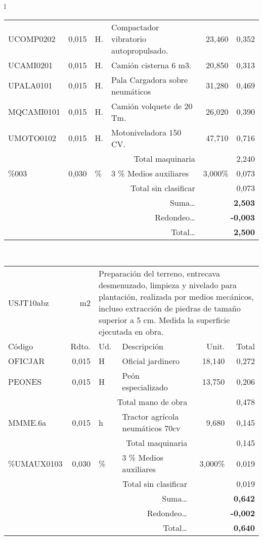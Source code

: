 \documentclass{book}%
\begin{document}
\begin{longtable}{l}
\begin{tabular}{l r l p{60mm} r r}
UCOMP0202&     0,015&H.&Compactador vibratorio autopropulsado.&    23,460&     0,352\\%
UCAMI0201&     0,015&H.&Camión cisterna 6 m3.&    20,850&     0,313\\%
UPALA0101&     0,015&H.&Pala Cargadora sobre neumáticos&    31,280&     0,469\\%
MQCAMI0101&     0,015&H.&Camión volquete de 20 Tm.&    26,020&     0,390\\%
UMOTO0102&     0,015&H.&Motoniveladora 150 CV.&    47,710&     0,716\\%
\multicolumn{4}{r}{Total maquinaria}&&     2,240\\%
\%003&     0,030&\%&3 \% Medios auxiliares&     3,000\%&     0,073\\%
\multicolumn{4}{r}{Total sin clasificar}&&     0,073\\%
\multicolumn{4}{r}{Suma\ldots}&\multicolumn{2}{r}{\textbf{     2,503}}\\%
\multicolumn{4}{r}{Redondeo\ldots}&\multicolumn{2}{r}{\textbf{    {-}0,003}}\\%
\multicolumn{4}{r}{Total\ldots}&\multicolumn{2}{r}{\textbf{     2,500}}\\%
\end{tabular}\\%
\begin{tabular}{l r l p{60mm} r r}%
USJT10abz&m2&\multicolumn{4}{p{95mm}}{Preparación del terreno, entrecava desmenuzado, limpieza y nivelado para plantación, realizada por medios mecánicos, incluso extracción de piedras de tamaño superior a 5 cm. Medida la superficie ejecutada en obra.}\\%
Código&Rdto.&Ud.&Descripción&Unit.&Total\\%
\hline%
OFICJAR&     0,015&H&Oficial jardinero&    18,140&     0,272\\%
PEONES&     0,015&H&Peón especializado&    13,750&     0,206\\%
\multicolumn{4}{r}{Total mano de obra}&&     0,478\\%
MMME.6a&     0,015&h&Tractor agrícola neumáticos 70cv&     9,680&     0,145\\%
\multicolumn{4}{r}{Total maquinaria}&&     0,145\\%
\%UMAUX0103&     0,030&\%&3 \% Medios auxiliares&     3,000\%&     0,019\\%
\multicolumn{4}{r}{Total sin clasificar}&&     0,019\\%
\multicolumn{4}{r}{Suma\ldots}&\multicolumn{2}{r}{\textbf{     0,642}}\\%
\multicolumn{4}{r}{Redondeo\ldots}&\multicolumn{2}{r}{\textbf{    {-}0,002}}\\%
\multicolumn{4}{r}{Total\ldots}&\multicolumn{2}{r}{\textbf{     0,640}}\\%
\end{tabular}\\%
\end{longtable}%
\normalsize

%
\end{document}
